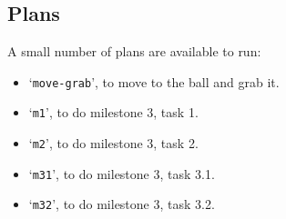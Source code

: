 \subsection{Plans}

A small number of plans are available to run:

\begin{itemize}
    \item `\texttt{move-grab}', to move to the ball and grab it.
    \item `\texttt{m1}', to do milestone 3, task 1.
    \item `\texttt{m2}', to do milestone 3, task 2.
    \item `\texttt{m31}', to do milestone 3, task 3.1.
    \item `\texttt{m32}', to do milestone 3, task 3.2.
\end{itemize}

